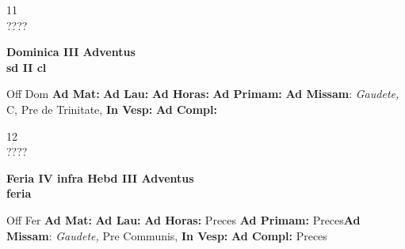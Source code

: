 \documentclass[10pt, openany]{book}
\begin{document}
    \begin{center}
        \begin{minipage}{3.5in}
            \vspace{2em}
            \begin{minipage}{0.5in}
                {\Huge 11} \\
                {\normalsize ????}
            \end{minipage}
            \begin{minipage}{3.0in}
                \textbf{ \large Dominica III Adventus \\
                \textnormal{\normalsize sd II cl}}

            \end{minipage}
            \begin{justify}Off Dom
                \textbf{Ad Mat: }
                \textbf{Ad Lau: }
                \textbf{Ad Horas: }
                \textbf{Ad Primam: }\textbf{Ad Missam}: \textit{Gaudete,} C, Pre de Trinitate, 
                \textbf{In Vesp: }
                \textbf{Ad Compl: }
            \end{justify}
        \end{minipage}
    \end{center}

    \begin{center}
        \begin{minipage}{3.5in}
            \vspace{2em}
            \begin{minipage}{0.5in}
                {\Huge 12} \\
                {\normalsize ????}
            \end{minipage}
            \begin{minipage}{3.0in}
                \textbf{ \large Feria IV infra Hebd III Adventus \\
                \textnormal{\normalsize feria}}

            \end{minipage}
            \begin{justify}Off Fer
                \textbf{Ad Mat: }
                \textbf{Ad Lau: }
                \textbf{Ad Horas: }Preces
                \textbf{Ad Primam: }Preces\textbf{Ad Missam}: \textit{Gaudete,} Pre Communis, 
                \textbf{In Vesp: }
                \textbf{Ad Compl: }Preces
            \end{justify}
        \end{minipage}
    \end{center}
\end{document}

